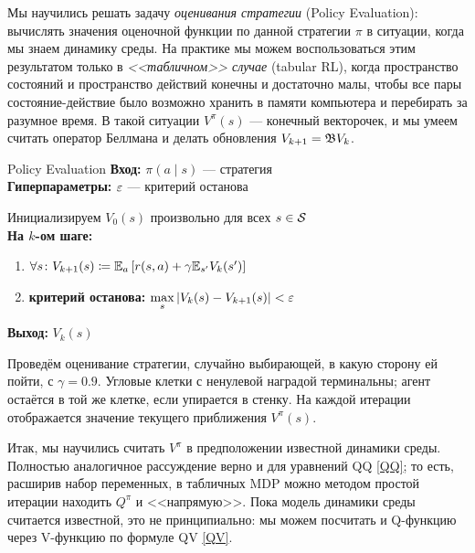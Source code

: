 Мы научились решать задачу \emph{оценивания стратегии} (Policy Evaluation): вычислять значения оценочной функции по данной стратегии $\pi$ в ситуации, когда мы знаем динамику среды. На практике мы можем воспользоваться этим результатом только в \emph{<<табличном>> случае} (tabular RL), когда пространство состояний и пространство действий конечны и достаточно малы, чтобы все пары состояние-действие было возможно хранить в памяти компьютера и перебирать за разумное время. В такой ситуации $V^\pi(s)$ --- конечный векторочек, и мы умеем считать оператор Беллмана и делать обновления $V_{k+1} = \mathfrak{B} V_k$.

\begin{algorithm}[label=policyevaluation]{Policy Evaluation}
\textbf{Вход:} $\pi(a \mid s)$ --- стратегия \\
\textbf{Гиперпараметры:} $\varepsilon$ --- критерий останова

\vspace{0.3cm}
Инициализируем $V_0(s)$ произвольно для всех $s \in \mathcal{S}$ \\
\textbf{На $k$-ом шаге:}
\begin{enumerate}
    \item $\forall s \colon V_{k+1}(s) \coloneqq \mathbb{E}_{a} \left[ r(s, a) + \gamma \mathbb{E}_{s'} V_k(s')\right]$
    \item \textbf{критерий останова:} $\max\limits_s |V_k(s) - V_{k+1}(s)| < \varepsilon$
\end{enumerate}

\vspace{0.3cm}
\textbf{Выход:} $V_k(s)$
\end{algorithm}

\begin{exampleBox}[label=ex:pe, righthand ratio=0.3, sidebyside, sidebyside align=center, lower separated=false]{}
Проведём оценивание стратегии, случайно выбирающей, в какую сторону ей пойти, с $\gamma = 0.9$. Угловые клетки с ненулевой наградой терминальны; агент остаётся в той же клетке, если упирается в стенку. На каждой итерации отображается значение текущего приближения $V^{\pi}(s)$.

\tcblower
\end{exampleBox}

Итак, мы научились считать $V^\pi$ в предположении известной динамики среды. Полностью аналогичное рассуждение верно и для уравнений QQ \eqref{QQ}; то есть, расширив набор переменных, в табличных MDP можно методом простой итерации находить $Q^{\pi}$ и <<напрямую>>. Пока модель динамики среды считается известной, это не принципиально: мы можем посчитать и Q-функцию через V-функцию по формуле QV \eqref{QV}.


